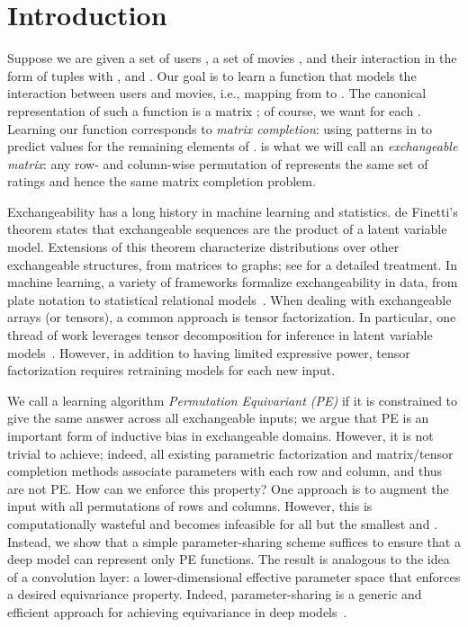\documentclass{article}
\theoremstyle{definition}
\begin{document}
\section{Introduction}\label{sec:intro}









Suppose we are given a set of users , a set of movies , and their interaction in the form of tuples  with ,  and . Our goal is to learn a function that models the interaction between users and movies, i.e., mapping from  to . The canonical representation of such a function is a matrix ; of course, we want  for each . Learning our function corresponds to \emph{matrix completion}: using patterns in  to predict values for the remaining elements of .
 is what we will call an \emph{exchangeable matrix}: any row- and column-wise permutation of  represents the same set of ratings and hence the same matrix completion problem. 

{Exchangeability}  has a long history in  machine learning and statistics.
{de Finetti}'s theorem states that exchangeable sequences are the product of a {latent variable model}. Extensions of this theorem characterize distributions over other exchangeable structures, from matrices to graphs; see \citet{orbanz2015bayesian} for a detailed treatment.
In machine learning, a variety of frameworks formalize exchangeability in data, from plate notation to {statistical relational models}~\citep{raedt2016statistical,getoor2007introduction}. 
When dealing with exchangeable arrays (or tensors), a common approach is {tensor factorization}. In particular, one thread of work leverages tensor decomposition for inference in latent variable models~\citep{anandkumar2014tensor}.
However, in addition to having limited expressive power, tensor factorization requires retraining models for each new input. 



We call a learning algorithm \emph{Permutation Equivariant (PE)} if it is constrained to give the same answer across all exchangeable inputs; we argue that PE is an important form of inductive bias in exchangeable domains. However, it is not trivial to achieve; indeed, all existing parametric factorization and matrix/tensor completion methods associate parameters with each row and column, and thus are not PE. How can we enforce this property? One approach is to augment the input with all  permutations of rows and columns.
However, this is computationally wasteful and becomes infeasible for all but the smallest  and . 
Instead, we show that a simple {parameter-sharing} scheme suffices to ensure that a deep model can represent only PE functions. 
The result is analogous to the idea of a convolution layer: a lower-dimensional effective parameter space that enforces a desired equivariance property. 
Indeed, parameter-sharing is a generic and efficient approach for achieving equivariance in deep models~\citep{ravanbakhsh_symmetry}. 
\end{document}
